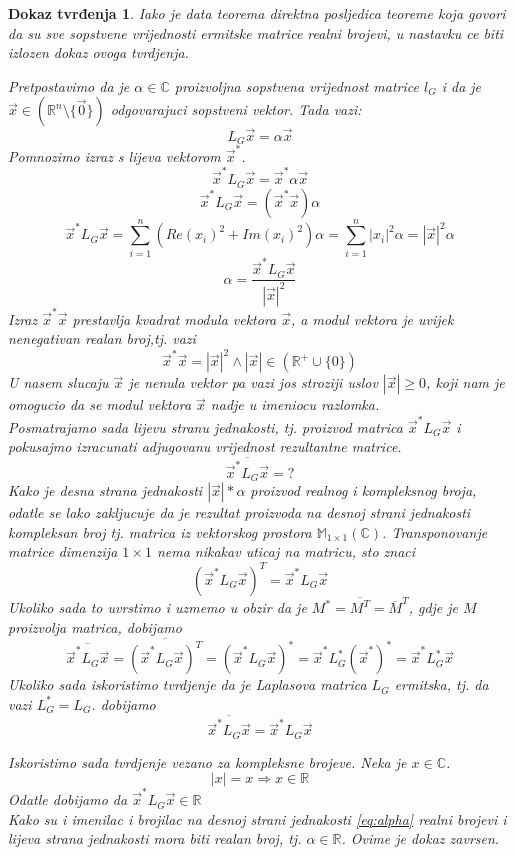\documentclass[11pt]{article}
\newtheorem*{custom_proof}{Dokaz tvrđenja}
\begin{document}
	\begin{custom_proof}
	Iako je data teorema direktna posljedica teoreme koja govori da su sve sopstvene vrijednosti ermitske matrice realni brojevi, u nastavku ce biti izlozen dokaz ovoga tvrdjenja.
	
	Pretpostavimo da je $\alpha \in \mathbb{C}$ proizvoljna sopstvena vrijednost matrice $l_G$ i da je $\vec{x} \in (\mathbb{R}^n \setminus \{\vec{0}\})$ odgovarajuci sopstveni vektor. Tada vazi:
	\[
		L_G\vec{x} = \alpha \vec{x}
	\]
	Pomnozimo izraz s lijeva vektorom $\vec{x}^*$.
	\[
		\vec{x}^*L_G\vec{x} = \vec{x}^*\alpha \vec{x}
	\]
	\[
		\vec{x}^*L_G\vec{x} = (\vec{x}^* \vec{x}) \alpha
	\]
	\[
		\vec{x}^*L_G\vec{x} = \sum_{i=1}^{n}(Re(x_i)^2 + Im(x_i)^2 ) \alpha =  \sum_{i=1}^{n}|x_i|^2 \alpha= |\vec{x}|^2 \alpha  
	\]
	\begin{equation}
		 \alpha =   \frac{\vec{x}^*L_G\vec{x}}{|\vec{x}|^2}
	\label{eq:alpha}
	\end{equation}
	Izraz $\vec{x}^* \vec{x}$ prestavlja kvadrat modula vektora $\vec{x}$, a modul vektora je uvijek nenegativan realan broj,tj. vazi
	\[
		\vec{x}^* \vec{x} = |\vec{x}|^2 \land |\vec{x}| \in (\mathbb{R}^+ \cup \{0\})  
	\]
	U nasem slucaju $\vec{x}$ je nenula vektor pa vazi jos stroziji uslov $|\vec{x}| \ge 0$, koji nam je omogucio da se modul vektora $\vec{x}$ nadje u imeniocu razlomka.  \\
	Posmatrajamo sada lijevu stranu jednakosti, tj. proizvod matrica $\vec{x}^*L_G\vec{x}$ i pokusajmo izracunati adjugovanu vrijednost rezultantne matrice.
	\[
		\overline{\vec{x}^*L_G\vec{x}} = ?
	\] 
	Kako je desna strana jednakosti $|\vec{x}| * \alpha$ proizvod realnog i kompleksnog broja, odatle se lako zakljucuje da je rezultat proizvoda na desnoj strani jednakosti kompleksan broj tj. matrica iz vektorskog prostora  $\mathbb{M}_{1 \times 1}(\mathbb{C})$. Transponovanje matrice dimenzija $1 \times 1$ nema nikakav uticaj na matricu, sto znaci
	\[
	(\vec{x}^*L_G\vec{x})^T = \vec{x}^*L_G\vec{x}
	\]
	Ukoliko sada to uvrstimo i uzmemo u obzir da je $M^*=\overline{M^T} =\overline{M}^T$, gdje je $M$ proizvolja matrica, dobijamo
	\[
		\overline{\vec{x}^*L_G\vec{x}} = \overline{(\vec{x}^*L_G\vec{x})^T} = (\vec{x}^*L_G\vec{x})^* = \vec{x}^*L_G^*(\vec{x}^*)^*= \vec{x}^*L_G^*\vec{x}
	\] 
	Ukoliko sada iskoristimo tvrdjenje da je Laplasova matrica $L_G$ ermitska, tj. da vazi $L_G^*=L_G$. dobijamo
	\[
		\overline{\vec{x}^*L_G\vec{x}} = \vec{x}^*L_G\vec{x}
	\] 
	
	Iskoristimo sada tvrdjenje vezano za kompleksne brojeve. Neka je $x \in \mathbb{C}$.
	\[
	 |x| = x \Rightarrow x \in \mathbb{R}
	\]
	Odatle dobijamo da  $\vec{x}^*L_G\vec{x} \in \mathbb{R}$ \\
	Kako su i imenilac i brojilac na desnoj strani jednakosti \ref{eq:alpha} realni brojevi i lijeva strana jednakosti mora biti realan broj, tj. $\alpha \in \mathbb{R}$. Ovime je dokaz zavrsen.
	\end{custom_proof}
	
\end{document}
